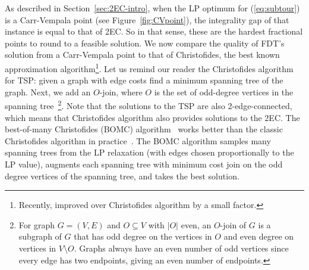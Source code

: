 As described in Section~\ref{sec:2EC-intro}, when the LP optimum for (\ref{eq:subtour}) is a Carr-Vempala point (see Figure~\ref{fig:CVpoint}), the integrality gap of that instance is equal to that of 2EC. So in that sense, these are the hardest fractional points to round to a feasible solution. We now compare the quality of FDT's solution from a Carr-Vempala point to that of Christofides, the best known approximation algorithm\footnote{Recently, \cite{KKO} improved over Christofides algorithm by a small factor.}. Let us remind our reader the Christofides algorithm for TSP: given a graph with edge costs find a minimum spanning tree of the graph.  
Next, we add an $O$-join, where $O$ is the set of odd-degree vertices in the spanning tree~\footnote{For graph $G=(V,E)$ and $O\subseteq V$ with $|O|$ even, an $O$-join of $G$ is a subgraph of $G$ that has odd degree on the vertices in $O$ and even degree on vertices in $V\setminus O$. Graphs always have an even number of odd vertices since every edge has two endpoints, giving an even number of endpoints.}. Note that the solutions to the TSP are also 2-edge-connected, which means that Christofides algorithm also provides solutions to the 2EC.
The best-of-many Christofides (BOMC) algorithm~\cite{AKS15} works better than the classic Christofides algorithm in practice~\cite{GW17}.  The BOMC algorithm samples many spanning trees from the LP relaxation (with edges chosen proportionally to the LP value), augments each spanning tree with minimum cost join on the odd degree vertices of the spanning tree, and takes the best solution.

